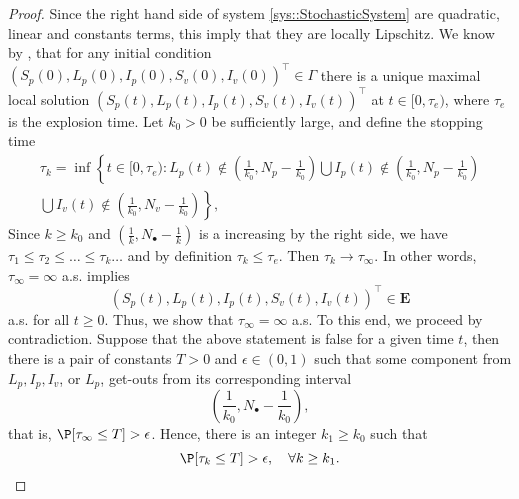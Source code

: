 \begin{proof}
		Since the right hand side of system \autoref{sys::StochasticSystem} are quadratic, 
	linear and constants terms, this imply that they are locally Lipschitz. We 
	know by \cite[see][pp.300]{Mao2008}, that for any initial condition
	$
		(
			S_p(0),
			L_p(0),
			I_p(0),
			S_v (0),
			I_v(0)
		)^{\top} \in \Gamma
	$ 
	there is a unique maximal local solution 
	$(S_p(t), L_p(t), I_p(t), S_v(t), I_v(t))^{\top}$ 
	at $t\in [0,\tau_e)$, where 
	$\tau_e$ is the explosion time. Let $k_0>0$ be sufficiently large, and 
	define the stopping time
	\begin{multline}
		\label{eqn:invariatn_set}
		\tau_k = %
			\inf
			\left\{
				t \in [0,\tau_e)
				: 
				L_p(t) \notin 
					\left(
						\frac{1}{k_0},
					 N_p - \frac{1}{k_0}
					\right)		
			 \bigcup 
				I_p(t)
				\notin
				\left(
					\frac{1}{k_0}, 
					N_p-\frac{1}{k_0}
				\right)
			\right.
			\\
			\bigcup
			\left.		
					I_v(t) 
					\notin
					\left(
						\frac{1}{k_0},
						N_v - \frac{1}{k_0}
					\right)
			\right\},
		\end{multline}
    Since $k\geq k_0$ and $\left(\frac{1}{k},N_{\bullet}-\frac{1}{k}\right)$ is a increasing by 
    the right side, we have $\tau_1\leq \tau_2\leq \dots \leq \tau_k \ldots$ and by definition
    $\tau_k\leq\tau_e$. Then $\tau_k\to \tau_{\infty}$. In other words, $\tau_\infty = \infty$ a.s. 
	implies
	\begin{equation}
		\label{eqn:invariance_prop}
		(
			S_p(t),
			L_p(t),
			I_p(t),
			S_v(t),
			I_v(t)
		)^{\top}\in \mathbf{E}
	\end{equation}
	 a.s. for all $t\geq 0$. Thus, 
	we  show that $\tau_\infty=\infty$ a.s. To this end,  we proceed
	by contradiction. Suppose that the above statement is false for a given 
	time $t$, then there is 
	a pair of constants $T>0$ and $\epsilon  \in (0,1)$  such that some 
	component from $L_p,I_p,I_v$, or $L_p$, get-outs from its corresponding 
	interval
	$$
	\left(
		\frac{1}{k_0}, 
	N_{\bullet} - \frac{1}{k_0}
	\right), 
	$$
	that is, %
	$
		\P[\tau_\infty\leq T]>\epsilon 
	$. 
	Hence, there is an integer $k_1\geq k_0$ such that
%	
	\begin{equation}\label{eqn::Probabilityoftau_k}
		\P[\tau_k\leq T]>\epsilon,
		\quad \forall k\geq k_1.
	\end{equation}
	

\end{proof}
